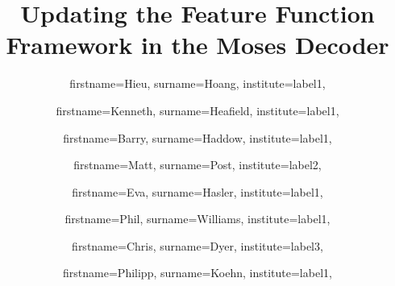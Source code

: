 \documentclass{pbml}
\begin{document}

\title{Updating the Feature Function Framework \titlelinebreak{} in the Moses Decoder}




\author{
  firstname=Hieu,
  surname=Hoang,
  institute=label1,
}
\author{
  firstname=Kenneth,
  surname=Heafield,
  institute=label1,
}
\author{
  firstname=Barry,
  surname=Haddow,
  institute=label1,
}
\author{
  firstname=Matt,
  surname=Post,
  institute=label2,
}
\author{
  firstname=Eva,
  surname=Hasler,
  institute=label1,
}
\author{
  firstname=Phil,
  surname=Williams,
  institute=label1,
}
\author{
  firstname=Chris,
  surname=Dyer,
  institute=label3,
}
\author{
  firstname=Philipp,
  surname=Koehn,
  institute=label1,
}

\end{document}
